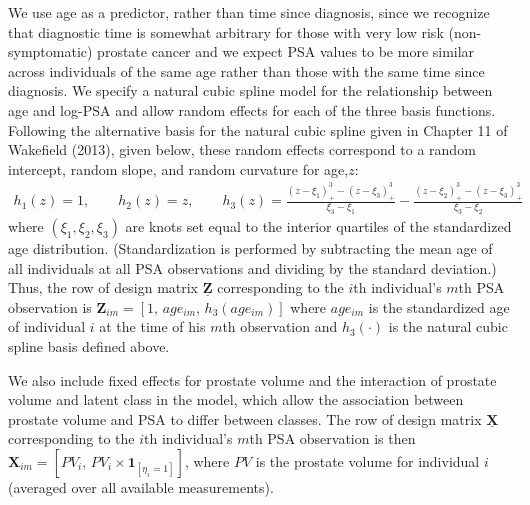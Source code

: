 \documentclass[12pt, letterpaper]{article}
\newcommand{\bmZ}{\mathbf{Z}}
\newcommand{\bmX}{\mathbf{X}}
\newcommand{\beas}{\begin{eqnarray*}}
\newcommand{\eeas}{\end{eqnarray*}}
\begin{document}
We use age as a predictor, rather than time since diagnosis, since we recognize that diagnostic time is somewhat arbitrary for those with very low risk (non-symptomatic) prostate cancer and we expect PSA values to be more similar across individuals of the same age rather than those with the same time since diagnosis. We specify a natural cubic spline model for the relationship between age and log-PSA and allow random effects for each of the three basis functions. Following the alternative basis for the natural cubic spline given in Chapter 11 of Wakefield (2013), given below, these random effects correspond to a random intercept, random slope, and random curvature for age,$z$:
\beas
h_1(z)=1,\qquad h_2(z)=z,\qquad h_3(z) = \frac{(z-\xi_1)^3_+ - (z-\xi_3)^3_+}{\xi_3 - \xi_1} - \frac{(z-\xi_2)^3_+ - (z-\xi_3)^3_+}{\xi_3 - \xi_2}
\eeas
where $(\xi_1,\xi_2, \xi_3)$ are knots set equal to the interior quartiles of the standardized age distribution. (Standardization is performed by subtracting the mean age of all individuals at all PSA observations and dividing by the standard deviation.) Thus, the row of design matrix $\underline{\bmZ}$ corresponding to the $i$th individual's $m$th PSA observation is $\bmZ_{im}= [1, \,age_{im}, \,h_3(age_{im})]$ where $age_{im}$ is the standardized age of individual $i$ at the time of his $m$th observation and $h_3(\cdot)$ is the natural cubic spline basis defined above. 

We also include fixed effects for prostate volume and the interaction of prostate volume and latent class in the model,  which allow the association between prostate volume and PSA to differ between classes. The row of design matrix $\underline{\bmX}$ corresponding to the $i$th individual's $m$th PSA observation is then $\bmX_{im} = [PV_i, \,PV_i\times\mathbf{1}_{[\eta_i=1]}]$, where $PV$ is the prostate volume for individual $i$ (averaged over all available measurements).
\end{document}
